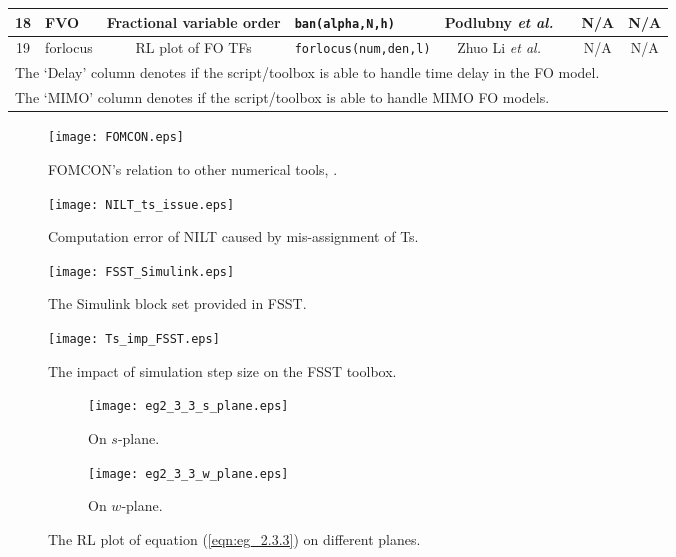 \documentclass[11pt]{tCON2e}
\theoremstyle{plain}\newtheorem{theorem}{Theorem}
\theoremstyle{definition}
\theoremstyle{remark}
\begin{document}
\begin{landscape}
\begin{table}[h]
\begin{center}
\begin{tabular}{|c| l|c|l|c|c|c|c|}
\hline
18   & FVO             & {\footnotesize F}ractional variable order  & {\tt ban(alpha,N,h)}   & Podlubny \emph{et al.} & \cite{ref:Igor_matrix_approach}   & N/A & N/A     \\
\hline
19   & forlocus        & RL plot of FO TFs      & {\tt forlocus(num,den,l)}   & Zhuo Li \emph{et al.}        & \cite{ref:FO_RL_mine}                             & N/A & N/A     \\
\hline
\multicolumn{8}{l}{The `Delay' column denotes if the script/toolbox is able to handle time delay in the FO model.} \\
\multicolumn{8}{l}{The `MIMO' column denotes if the script/toolbox is able to handle MIMO FO models.}
\end{tabular}
\end{center}
\end{table}
\end{landscape}





\begin{figure}[h]
\centering
\texttt{[image: FOMCON.eps]}
\caption{FOMCON's relation to other numerical tools, \cite{ref:FO_ID_MS_Thesis}.}
\label{fig:FOMCON_relation}
\end{figure}

\begin{figure}[h]
\centering
\texttt{[image: NILT\_ts\_issue.eps]}
\caption{Computation error of NILT caused by mis-assignment of Ts.}
\label{fig:NILT_ts_issue}
\end{figure}

\begin{figure}[h]
\centering
\texttt{[image: FSST\_Simulink.eps]}
\caption{The Simulink block set provided in FSST.}
\label{fig:FSST_Simulink}
\end{figure}


\begin{figure}[h]
\centering
\texttt{[image: Ts\_imp\_FSST.eps]}
\caption{The impact of simulation step size on the FSST toolbox.}
\label{fig:Ts_imp_FSST}
\end{figure}


\begin{figure}[h!]
\centering
    \begin{subfigure}[b]{0.49\textwidth}
        \texttt{[image: eg2\_3\_3\_s\_plane.eps]}
        \caption{On $s$-plane.}
        \label{fig:eg2_3_3_a}
    \end{subfigure}
    \begin{subfigure}[b]{0.49\textwidth}
        \texttt{[image: eg2\_3\_3\_w\_plane.eps]}
        \caption{On $w$-plane.}
        \label{fig:eg2_3_3_b}
    \end{subfigure}\caption{The RL plot of equation (\ref{eqn:eg_2.3.3}) on different planes.}
    \label{fig:eg2_3_3}
\end{figure}
\end{document}
